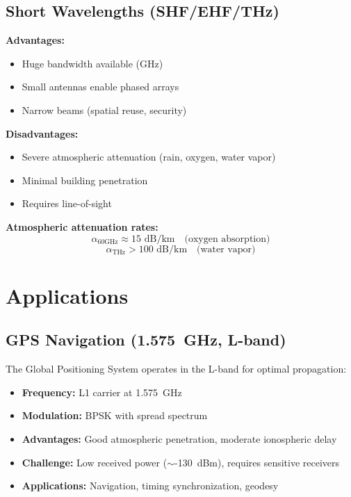 \subsection{Short Wavelengths (SHF/EHF/THz)}

\textbf{Advantages:}
\begin{itemize}
\item Huge bandwidth available (GHz)
\item Small antennas enable phased arrays
\item Narrow beams (spatial reuse, security)
\end{itemize}

\textbf{Disadvantages:}
\begin{itemize}
\item Severe atmospheric attenuation (rain, oxygen, water vapor)
\item Minimal building penetration
\item Requires line-of-sight

\end{itemize}

\textbf{Atmospheric attenuation rates:}
\begin{equation}
\alpha_{60\text{GHz}} \approx 15 \text{ dB/km} \quad \text{(oxygen absorption)}
\end{equation}
\begin{equation}
\alpha_{\text{THz}} > 100 \text{ dB/km} \quad \text{(water vapor)}
\end{equation}

\section{Applications}

\subsection{GPS Navigation (1.575~GHz, L-band)}

The Global Positioning System operates in the L-band for optimal propagation:
\begin{itemize}
\item \textbf{Frequency:} L1 carrier at 1.575~GHz
\item \textbf{Modulation:} BPSK with spread spectrum
\item \textbf{Advantages:} Good atmospheric penetration, moderate ionospheric delay
\item \textbf{Challenge:} Low received power ($\sim$-130~dBm), requires sensitive receivers
\item \textbf{Applications:} Navigation, timing synchronization, geodesy
\end{itemize}


